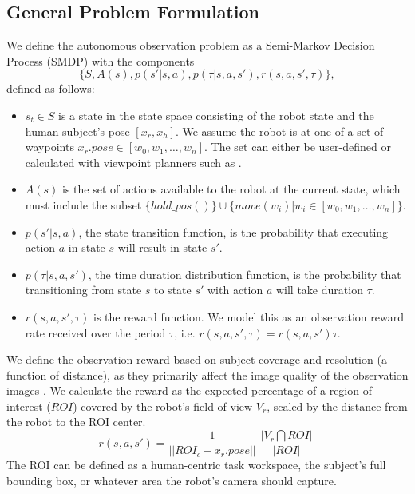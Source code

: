 \documentclass[letterpaper, 10 pt, conference]{ieeeconf}  %
\begin{document}
\subsection{General Problem Formulation}
We define the autonomous observation problem as a Semi-Markov Decision Process (SMDP) \cite{hu2007markov} with the components
\begin{equation}
\{S, A(s), p(s'|s,a), p(\tau|s,a,s'), r(s,a,s',\tau)\},
\end{equation}
defined as follows:
\begin{itemize}
\item $s_t \in S$ is a state in the state space consisting of the robot state and the human subject's pose $[x_r, x_h]$.  We assume the robot is at one of a set of waypoints $x_r.pose \in [w_0, w_1, \ldots, w_n]$.  The set can either be user-defined or calculated with viewpoint planners such as \cite{schroeter2009autonomous}.
\item $A(s)$ is the set of actions available to the robot at the current state, which must include the subset $\{hold\_pos()\} \cup \{move(w_i) | w_i \in [w_0, w_1, \ldots, w_n]\}$.
\item $p(s'|s,a)$, the state transition function, is the probability that executing action $a$ in state $s$ will result in state $s'$.
\item $p(\tau|s,a,s')$, the time duration distribution function, is the probability that transitioning from state $s$ to state $s'$ with action $a$ will take duration $\tau$.
\item $r(s,a,s',\tau)$ is the reward function.  We model this as an observation reward rate received over the period $\tau$, i.e. $r(s,a,s',\tau)=r(s,a,s')\tau$.
\end{itemize}

We define the observation reward based on subject coverage and resolution (a function of distance), as they primarily affect the image quality of the observation images \cite{bodor2005mobile}.  We calculate the reward as the expected percentage of a region-of-interest ($ROI$) covered by the robot's field of view $V_r$, scaled by the distance from the robot to the ROI center.
\begin{equation}
r(s,a,s') = \frac{1}{||ROI_{c} - x_r.pose||}\frac{||V_r \bigcap ROI||}{||ROI||}
\label{eq:reward}
\end{equation}
The ROI can be defined as a human-centric task workspace, the subject's full bounding box, or whatever area the robot's camera should capture.
\end{document}
